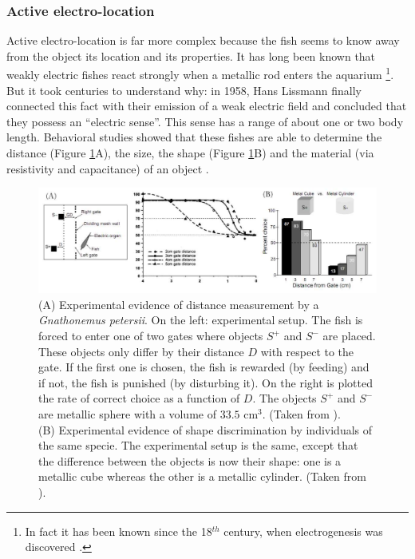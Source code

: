 \subsubsection{Active electro-location}
\label{eq:active-electroloc-intro}

Active electro-location is far more complex because the fish seems
to know away from the object its location and its properties. It has
long been known that weakly electric fishes react strongly when a
metallic rod enters the aquarium %
\footnote{In fact it has been known since the 18$^{th}$ century, when electrogenesis was discovered
\cite{moller1995electric}.}. But it took centuries to understand why: in 1958, Hans Lissmann
finally connected this fact with their emission of a weak electric
field and concluded that they possess an ``electric sense''. This
sense has a range of about one or two body length. Behavioral studies
showed that these fishes are able to determine the distance (Figure
\ref{fig:distance_discrimination}A), the size, the shape (Figure
\ref{fig:distance_discrimination}B) and the material (via resistivity
and capacitance) of an object \cite{von1999active,von1992electro-location,von1993electric}.

\begin{figure}[h]
\centering
\includegraphics[width=\textwidth]{intro/figures/behavior_exp}
\caption{(A) Experimental evidence of distance measurement by a \emph{Gnathonemus
petersii}. On the left: experimental setup. The fish is forced to
enter one of two gates where objects $S^{+}$ and $S^{-}$ are placed.
These objects only differ by their distance $D$ with respect to the
gate. If the first one is chosen, the fish is rewarded (by feeding)
and if not, the fish is punished (by disturbing it). On the right
is plotted the rate of correct choice as a function of $D$. The objects
$S^{+}$ and $S^{-}$ are metallic sphere with a volume of $33.5$
cm$^{3}$. (Taken from \cite{von1993electric}). \protect \\
 (B) Experimental evidence of shape discrimination by individuals
of the same specie. The experimental setup is the same, except that
the difference between the objects is now their shape: one is a metallic
cube whereas the other is a metallic cylinder. (Taken from \cite{gerhard}).
\label{fig:distance_discrimination}}
\end{figure}

